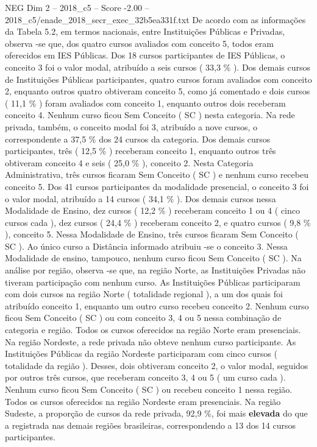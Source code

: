 \begin{textsample}{NEG Dim 2 – 2018\_c5 – Score -2.00 – 2018\_c5/enade\_2018\_secr\_exec\_32b5ea331f.txt}
De acordo com as informações da Tabela 5.2, em termos nacionais, entre Instituições Públicas e Privadas, observa -se que, dos quatro cursos avaliados com conceito 5, todos eram oferecidos em IES Públicas.
Dos 18 cursos participantes de IES Públicas, o conceito 3 foi o valor modal, atribuído a seis cursos ( 33,3 \% ).
Dos demais cursos de Instituições Públicas participantes, quatro cursos foram avaliados com conceito 2, enquanto outros quatro obtiveram conceito 5, como já comentado e dois cursos ( 11,1 \% ) foram avaliados com conceito 1, enquanto outros dois receberam conceito 4.
Nenhum curso ficou Sem Conceito ( SC ) nesta categoria.
Na rede privada, também, o conceito modal foi 3, atribuído a nove cursos, o correspondente a 37,5 \% dos 24 cursos da categoria.
Dos demais cursos participantes, três ( 12,5 \% ) receberam conceito 1, enquanto outros três obtiveram conceito 4 e seis ( 25,0 \% ), conceito 2.
Nesta Categoria Administrativa, três cursos ficaram Sem Conceito ( SC ) e nenhum curso recebeu conceito 5.
Dos 41 cursos participantes da modalidade presencial, o conceito 3 foi o valor modal, atribuído a 14 cursos ( 34,1 \% ).
Dos demais cursos nessa Modalidade de Ensino, dez cursos ( 12,2 \% ) receberam conceito 1 ou 4 ( cinco cursos cada ), dez cursos ( 24,4 \% ) receberam conceito 2, e quatro cursos ( 9,8 \% ), conceito 5.
Nessa Modalidade de Ensino, três cursos ficaram Sem Conceito ( SC ).
Ao único curso a Distância informado atribuiu -se o conceito 3.
Nessa Modalidade de ensino, tampouco, nenhum curso ficou Sem Conceito ( SC ).
Na análise por região, observa -se que, na região Norte, as Instituições Privadas não tiveram participação com nenhum curso.
As Instituições Públicas participaram com dois cursos na região Norte ( totalidade regional ), a um dos quais foi atribuído conceito 1, enquanto um outro curso recebeu conceito 2.
Nenhum curso ficou Sem Conceito ( SC ) ou com conceito 3, 4 ou 5 nessa combinação de categoria e região.
Todos os cursos oferecidos na região Norte eram presenciais.
Na região Nordeste, a rede privada não obteve nenhum curso participante.
As Instituições Públicas da região Nordeste participaram com cinco cursos ( totalidade da região ).
Desses, dois obtiveram conceito 2, o valor modal, seguidos por outros três cursos, que receberam conceito 3, 4 ou 5 ( um curso cada ).
Nenhum curso ficou Sem Conceito ( SC ) ou recebeu conceito 1 nessa região.
Todos os cursos oferecidos na região Nordeste eram presenciais.
Na região Sudeste, a proporção de cursos da rede privada, 92,9 \%, foi mais \textbf{elevada} do que a registrada nas demais regiões brasileiras, correspondendo a 13 dos 14 cursos participantes.

\end{textsample}
